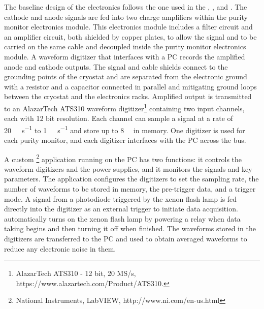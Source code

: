 The baseline design of the  electronics follows the one used in %
the , , 
and \microboone. The cathode and anode signals are fed into two charge amplifiers within the purity monitor electronics module.
This electronics module includes a  filter circuit and an amplifier circuit, both shielded by copper plates, to allow the signal and  to be carried on the same cable and decoupled inside the purity monitor electronics module. 
A waveform digitizer that interfaces with a  PC records the amplified anode and cathode outputs. 
The signal and  cable shields connect to the grounding points of the cryostat and are separated from the electronic ground with a resistor and a capacitor connected in parallel and mitigating ground loops between the cryostat and the electronics racks. Amplified output is transmitted to an AlazarTech ATS310 waveform digitizer\footnote{AlazarTech ATS310\texttrademark{} - 12 bit, 20 MS/s,  https://www.alazartech.com/Product/ATS310.} containing two input channels, each with 12 bit resolution. Each channel can sample a signal at a rate of \SI{20}{\mega\samples\per\second} to \SI{1}{\kilo\samples\per\second} and store up to \SI{8}{\mega\samples} in memory. One digitizer is used for each purity monitor, and each digitizer interfaces with the  PC across the  bus. 


A custom \footnote{National Instruments, LabVIEW\texttrademark{}, http://www.ni.com/en-us.html} application running on the  PC has two functions: it controls the waveform digitizers and the power supplies, and it monitors the signals and key parameters. The application configures the digitizers to set the sampling rate, the number of waveforms to be stored in memory, the pre-trigger data, and a trigger mode. A signal from a photodiode triggered by the xenon flash lamp is fed directly into the digitizer as an external trigger to initiate data acquisition.   automatically turns on the xenon flash lamp by powering a relay when data taking begins and then turning it off when finished.
The waveforms stored in the digitizers are transferred to the  PC and used to obtain averaged waveforms to reduce any electronic noise in them. %

